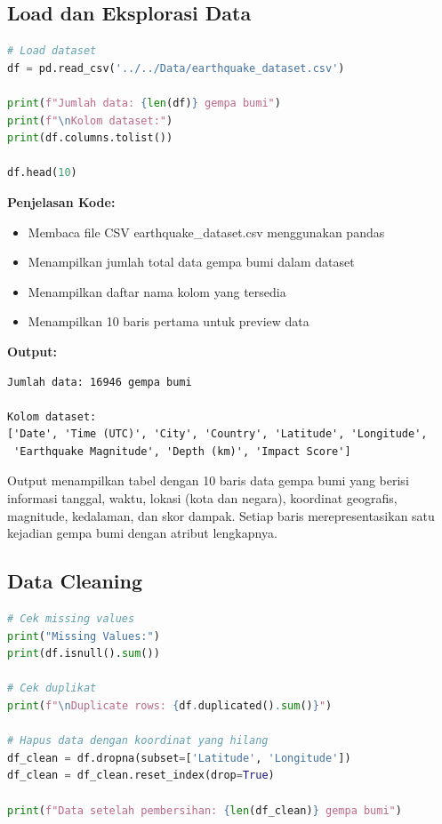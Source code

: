 \documentclass[12pt,a4paper]{article}
\begin{document}
\subsection{Load dan Eksplorasi Data}

\begin{lstlisting}[language=Python, caption=Load Dataset Gempa Bumi]
# Load dataset
df = pd.read_csv('../../Data/earthquake_dataset.csv')

print(f"Jumlah data: {len(df)} gempa bumi")
print(f"\nKolom dataset:")
print(df.columns.tolist())

df.head(10)
\end{lstlisting}

\textbf{Penjelasan Kode:}
\begin{itemize}
    \item Membaca file CSV earthquake\_dataset.csv menggunakan pandas
    \item Menampilkan jumlah total data gempa bumi dalam dataset
    \item Menampilkan daftar nama kolom yang tersedia
    \item Menampilkan 10 baris pertama untuk preview data
\end{itemize}

\textbf{Output:}
\begin{verbatim}
Jumlah data: 16946 gempa bumi

Kolom dataset:
['Date', 'Time (UTC)', 'City', 'Country', 'Latitude', 'Longitude', 
 'Earthquake Magnitude', 'Depth (km)', 'Impact Score']
\end{verbatim}

Output menampilkan tabel dengan 10 baris data gempa bumi yang berisi informasi tanggal, waktu, lokasi (kota dan negara), koordinat geografis, magnitude, kedalaman, dan skor dampak. Setiap baris merepresentasikan satu kejadian gempa bumi dengan atribut lengkapnya.

\subsection{Data Cleaning}

\begin{lstlisting}[language=Python, caption=Pembersihan Data]
# Cek missing values
print("Missing Values:")
print(df.isnull().sum())

# Cek duplikat
print(f"\nDuplicate rows: {df.duplicated().sum()}")

# Hapus data dengan koordinat yang hilang
df_clean = df.dropna(subset=['Latitude', 'Longitude'])
df_clean = df_clean.reset_index(drop=True)

print(f"Data setelah pembersihan: {len(df_clean)} gempa bumi")
\end{lstlisting}
\end{document}
